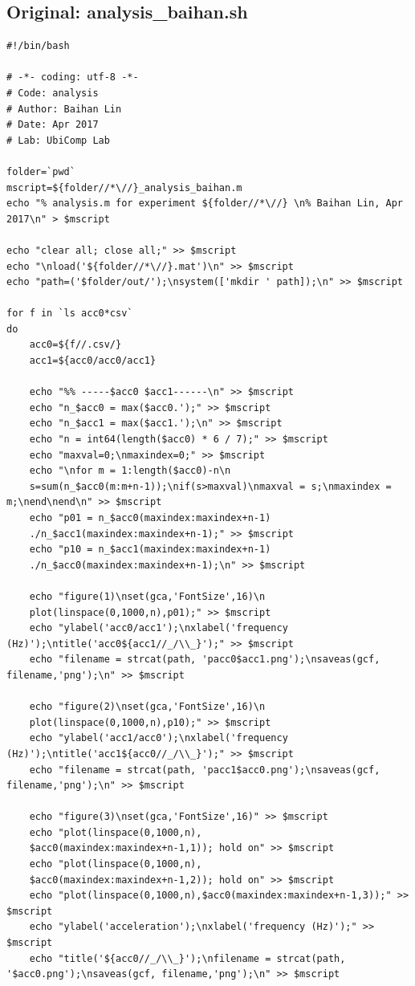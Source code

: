 \documentclass{sigchi}
\begin{document}
\subsection{Original: analysis\_baihan.sh}\label{ss:ana.sh}
\begin{lstlisting}
#!/bin/bash

# -*- coding: utf-8 -*-
# Code: analysis
# Author: Baihan Lin
# Date: Apr 2017
# Lab: UbiComp Lab

folder=`pwd`
mscript=${folder//*\//}_analysis_baihan.m
echo "% analysis.m for experiment ${folder//*\//} \n% Baihan Lin, Apr 2017\n" > $mscript

echo "clear all; close all;" >> $mscript
echo "\nload('${folder//*\//}.mat')\n" >> $mscript
echo "path=('$folder/out/');\nsystem(['mkdir ' path]);\n" >> $mscript

for f in `ls acc0*csv`
do
    acc0=${f//.csv/}
    acc1=${acc0/acc0/acc1}

	echo "%% -----$acc0 $acc1------\n" >> $mscript
    echo "n_$acc0 = max($acc0.');" >> $mscript
    echo "n_$acc1 = max($acc1.');\n" >> $mscript
    echo "n = int64(length($acc0) * 6 / 7);" >> $mscript
    echo "maxval=0;\nmaxindex=0;" >> $mscript
    echo "\nfor m = 1:length($acc0)-n\n
    s=sum(n_$acc0(m:m+n-1));\nif(s>maxval)\nmaxval = s;\nmaxindex = m;\nend\nend\n" >> $mscript
    echo "p01 = n_$acc0(maxindex:maxindex+n-1)
    ./n_$acc1(maxindex:maxindex+n-1);" >> $mscript
    echo "p10 = n_$acc1(maxindex:maxindex+n-1)
    ./n_$acc0(maxindex:maxindex+n-1);\n" >> $mscript

	echo "figure(1)\nset(gca,'FontSize',16)\n
    plot(linspace(0,1000,n),p01);" >> $mscript
	echo "ylabel('acc0/acc1');\nxlabel('frequency (Hz)');\ntitle('acc0${acc1//_/\\_}');" >> $mscript
	echo "filename = strcat(path, 'pacc0$acc1.png');\nsaveas(gcf, filename,'png');\n" >> $mscript

	echo "figure(2)\nset(gca,'FontSize',16)\n
    plot(linspace(0,1000,n),p10);" >> $mscript
	echo "ylabel('acc1/acc0');\nxlabel('frequency (Hz)');\ntitle('acc1${acc0//_/\\_}');" >> $mscript
	echo "filename = strcat(path, 'pacc1$acc0.png');\nsaveas(gcf, filename,'png');\n" >> $mscript

	echo "figure(3)\nset(gca,'FontSize',16)" >> $mscript
	echo "plot(linspace(0,1000,n),
    $acc0(maxindex:maxindex+n-1,1)); hold on" >> $mscript
	echo "plot(linspace(0,1000,n),
    $acc0(maxindex:maxindex+n-1,2)); hold on" >> $mscript
	echo "plot(linspace(0,1000,n),$acc0(maxindex:maxindex+n-1,3));" >> $mscript
	echo "ylabel('acceleration');\nxlabel('frequency (Hz)');" >> $mscript
	echo "title('${acc0//_/\\_}');\nfilename = strcat(path, '$acc0.png');\nsaveas(gcf, filename,'png');\n" >> $mscript


\end{lstlisting}
\end{document}

